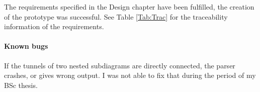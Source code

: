 The requirements specified in the Design chapter have been fulfilled, the creation of the prototype was successful. See Table \ref{Tab:Trac} for the traceability information of the requirements.

\paragraph{Known bugs} If the tunnels of two nested subdiagrams are directly connected, the parser crashes, or gives wrong output. I was not able to fix that during the period of my BSc thesis.



\begin{table}[ht]


\end{table}
